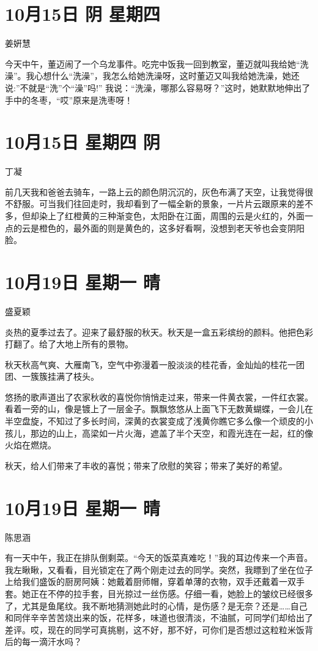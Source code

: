 \section{10月15日 阴 星期四}

姜姸慧

今天中午，董迈闹了一个乌龙事件。吃完中饭我一回到教室，董迈就叫我给她``洗澡''。我心想什么``洗澡''，我怎么给她洗澡呀，这时董迈又叫我给她洗澡，她还说:''不就是``洗''个``澡''吗!''
我说：``洗澡，哪那么容易呀？''这时，她默默地伸出了手中的冬枣，``哎''原来是洗枣呀！

\section{10月15日 星期四 阴}

丁凝

前几天我和爸爸去骑车，一路上云的颜色阴沉沉的，灰色布满了天空，让我觉得很不舒服。可当我们往回走时，我却看到了一幅全新的景象，一片片云跟原来的差不多，但却染上了红橙黄的三种渐变色，太阳卧在江面，周围的云是火红的，外面一点的云是橙色的，最外面的则是黄色的，这多好看啊，没想到老天爷也会变阴阳脸。

\section{10月19日 星期一 晴}

盛夏颖

炎热的夏季过去了。迎来了最舒服的秋天。秋天是一盒五彩缤纷的颜料。他把色彩打翻了。给了大地上所有的景物。

秋天秋高气爽、大雁南飞，空气中弥漫着一股淡淡的桂花香，金灿灿的桂花一团团、一簇簇挂满了枝头。

悠扬的歌声道出了农家秋收的喜悦你悄悄走过来，带来一件黄衣裳，一件红衣裳。看着一旁的山，像是镀上了一层金子。飘飘悠悠从上面飞下无数黄蝴蝶，一会儿在半空盘旋，不知过了多长时间，深黄的衣裳变成了浅黄你瞧它多么像一个顽皮的小孩儿，那边的山上，高梁如一片火海，遮盖了半个天空，和霞光连在一起，红的像火焰在燃烧。

秋天，给人们带来了丰收的喜悦；带来了欣慰的笑容；带来了美好的希望。

\section{10月19日 星期一 晴}

陈思涵

有一天中午，我正在排队倒剩菜。``今天的饭菜真难吃！''我的耳边传来一个声音。我左瞅瞅，又看看，目光锁定在了两个刚走过去的同学。突然，我瞟到了坐在位子上给我们盛饭的厨房阿姨：她戴着厨师帽，穿着单薄的衣物，双手还戴着一双手套。她正在不停的拉手套，目光掠过一丝伤感。仔细一看，她脸上的皱纹已经很多了，尤其是鱼尾纹。我不断地猜测她此时的心情，是伤感？是无奈？还是\ldots\ldots 自己和同伴辛辛苦苦烧出来的饭，花样多，味道也很清淡，不油腻，可同学们却给出了差评。哎，现在的同学可真挑剔，这不好，那不好，可你们是否想过这粒粒米饭背后的每一滴汗水吗？

